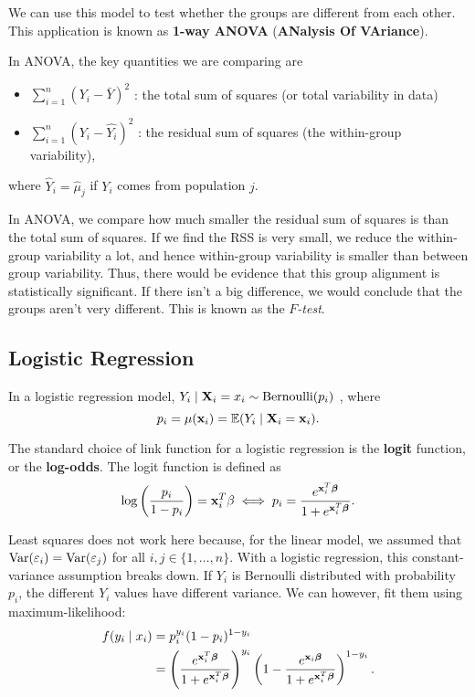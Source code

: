 \begin{definition}
		We can use this model to test whether the groups are different from each other. This application is known as \textbf{1-way ANOVA} (\textbf{ANalysis Of VAriance}).
\end{definition}

In ANOVA, the key quantities we are comparing are 

\begin{itemize}
	\item $\sum_{i=1}^{n} (Y_i-\bar{Y})^2$ : the total sum of squares (or total variability in data)
	\item $\sum^n_{i=1}(Y_i-\hat{Y_i})^2$ : the residual sum of squares (the within-group variability),
\end{itemize}
where $\hat{Y}_i=\hat{\mu}_j$ if $Y_i$ comes from population $j$. 

\begin{remark}
	In ANOVA, we compare how much smaller the residual sum of squares is than the total sum of squares. If we find the RSS is very small, we reduce the within-group variability a lot, and hence within-group variability is smaller than between group variability. Thus, there would be evidence that this group alignment is statistically significant. If there isn't a big difference, we would conclude that the groups aren't very different. This is known as the \textit{$F$-test}.
\end{remark}

\subsection{Logistic Regression}

In a logistic regression model, $Y_i\mid \mathbf X_i=x_i \sim \operatorname*{Bernoulli}(p_i)$ , where \[
p_i=\mu(\mathbf x_i)=\mathbb E(Y_i\mid\mathbf X_i=\mathbf x_i)
.\] 

\begin{definition}
	The standard choice of link function for a logistic regression is the \textbf{logit} function, or the \textbf{log-odds}. The logit function is defined as
	\[
		\log\left( \frac{p_i}{1-p_i} \right) =\mathbf x_i^T\beta \;\Longleftrightarrow\; p_i=\frac{{e}^{\mathbf x_i^T{\boldsymbol{\beta}} }}{1+e^{\mathbf x_i^T{\boldsymbol{\beta}}}}
	.\] 
\end{definition}

\begin{remark}
	Least squares does not work here because, for the linear model, we assumed that $\operatorname*{Var}(\varepsilon_i)=\operatorname*{Var}(\varepsilon_j)$ for all $i,j\in\{1,\ldots, n\}.$ With a logistic regression, this constant-variance assumption breaks down. If $Y_i$ is Bernoulli distributed with probability $p_i$, the different $Y_i$ values have different variance. We can however, fit them using maximum-likelihood:
	\begin{align*}
			f(y_i\mid x_i) &= p_i^{y_i}(1-p_i)^{1-y_i} \\
						   &= \left( \frac{e^{\mathbf x_i^T{\boldsymbol{\beta}}}}{1+e^{\mathbf x_i^T{\boldsymbol{\beta}}}} \right)^{y_i}\left(1-\frac{e^{\mathbf x_i{\boldsymbol{\beta}}}}{1+e^{\mathbf x_i^T{\boldsymbol{\beta}}}}  \right)^{1-y_i}  
.\end{align*}
\end{remark}

